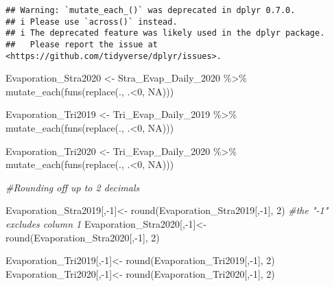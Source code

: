 \documentclass[
]{article}
\newenvironment{Shaded}{\begin{snugshade}}{\end{snugshade}}
\newcommand{\CommentTok}[1]{\textcolor[rgb]{0.56,0.35,0.01}{\textit{#1}}}
\newcommand{\ConstantTok}[1]{\textcolor[rgb]{0.00,0.00,0.00}{#1}}
\newcommand{\DecValTok}[1]{\textcolor[rgb]{0.00,0.00,0.81}{#1}}
\newcommand{\FunctionTok}[1]{\textcolor[rgb]{0.00,0.00,0.00}{#1}}
\newcommand{\NormalTok}[1]{#1}
\newcommand{\OtherTok}[1]{\textcolor[rgb]{0.56,0.35,0.01}{#1}}
\newcommand{\SpecialCharTok}[1]{\textcolor[rgb]{0.00,0.00,0.00}{#1}}
\begin{document}
\begin{verbatim}
## Warning: `mutate_each_()` was deprecated in dplyr 0.7.0.
## i Please use `across()` instead.
## i The deprecated feature was likely used in the dplyr package.
##   Please report the issue at <https://github.com/tidyverse/dplyr/issues>.
\end{verbatim}

\begin{Shaded}
\begin{Highlighting}[]
\NormalTok{Evaporation\_Stra2020 }\OtherTok{\textless{}{-}}\NormalTok{ Stra\_Evap\_Daily\_2020 }\SpecialCharTok{\%\textgreater{}\%} 
                         \FunctionTok{mutate\_each}\NormalTok{(}\FunctionTok{funs}\NormalTok{(}\FunctionTok{replace}\NormalTok{(., .}\SpecialCharTok{\textless{}}\DecValTok{0}\NormalTok{, }\ConstantTok{NA}\NormalTok{)))}


\NormalTok{Evaporation\_Tri2019 }\OtherTok{\textless{}{-}}\NormalTok{ Tri\_Evap\_Daily\_2019 }\SpecialCharTok{\%\textgreater{}\%} 
                         \FunctionTok{mutate\_each}\NormalTok{(}\FunctionTok{funs}\NormalTok{(}\FunctionTok{replace}\NormalTok{(., .}\SpecialCharTok{\textless{}}\DecValTok{0}\NormalTok{, }\ConstantTok{NA}\NormalTok{)))}

\NormalTok{Evaporation\_Tri2020 }\OtherTok{\textless{}{-}}\NormalTok{ Tri\_Evap\_Daily\_2020 }\SpecialCharTok{\%\textgreater{}\%} 
                         \FunctionTok{mutate\_each}\NormalTok{(}\FunctionTok{funs}\NormalTok{(}\FunctionTok{replace}\NormalTok{(., .}\SpecialCharTok{\textless{}}\DecValTok{0}\NormalTok{, }\ConstantTok{NA}\NormalTok{)))}

\CommentTok{\#Rounding off up to 2 decimals}

\NormalTok{Evaporation\_Stra2019[,}\SpecialCharTok{{-}}\DecValTok{1}\NormalTok{]}\OtherTok{\textless{}{-}} \FunctionTok{round}\NormalTok{(Evaporation\_Stra2019[,}\SpecialCharTok{{-}}\DecValTok{1}\NormalTok{], }\DecValTok{2}\NormalTok{)             }\CommentTok{\#the "{-}1" excludes column 1 }
\NormalTok{Evaporation\_Stra2020[,}\SpecialCharTok{{-}}\DecValTok{1}\NormalTok{]}\OtherTok{\textless{}{-}} \FunctionTok{round}\NormalTok{(Evaporation\_Stra2020[,}\SpecialCharTok{{-}}\DecValTok{1}\NormalTok{], }\DecValTok{2}\NormalTok{)  }

\NormalTok{Evaporation\_Tri2019[,}\SpecialCharTok{{-}}\DecValTok{1}\NormalTok{]}\OtherTok{\textless{}{-}} \FunctionTok{round}\NormalTok{(Evaporation\_Tri2019[,}\SpecialCharTok{{-}}\DecValTok{1}\NormalTok{], }\DecValTok{2}\NormalTok{)             }
\NormalTok{Evaporation\_Tri2020[,}\SpecialCharTok{{-}}\DecValTok{1}\NormalTok{]}\OtherTok{\textless{}{-}} \FunctionTok{round}\NormalTok{(Evaporation\_Tri2020[,}\SpecialCharTok{{-}}\DecValTok{1}\NormalTok{], }\DecValTok{2}\NormalTok{) }
\end{Highlighting}
\end{Shaded}
\end{document}
